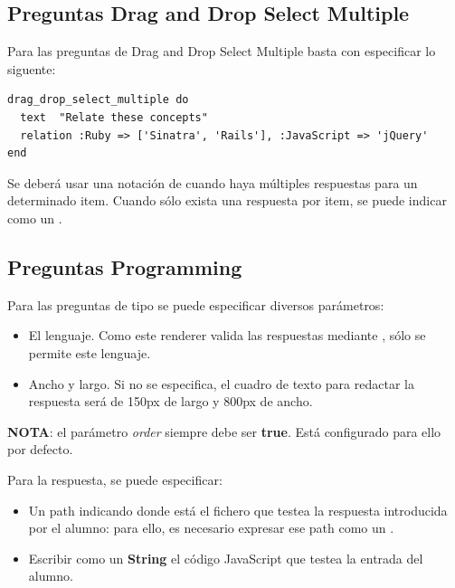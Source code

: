 \subsection{Preguntas Drag and Drop Select Multiple}
\label{subsec:Apendice2.7}

Para las preguntas de Drag and Drop Select Multiple basta con especificar lo siguente:
\begin{lstlisting}
drag_drop_select_multiple do
  text  "Relate these concepts"
  relation :Ruby => ['Sinatra', 'Rails'], :JavaScript => 'jQuery'
end
\end{lstlisting}

Se deber\'a usar una notaci\'on de  cuando haya m\'ultiples respuestas para un determinado item. Cuando s\'olo exista una respuesta por item,
se puede indicar como un .

\subsection{Preguntas Programming}
\label{subsec:Apendice2.8}

Para las preguntas de tipo  se puede especificar diversos par\'ametros:
\begin{itemize}
  \item El lenguaje. Como este renderer valida las respuestas mediante , s\'olo se permite este lenguaje.
  \item Ancho y largo. Si no se especifica, el cuadro de texto para redactar la respuesta ser\'a de 150px de largo y 800px de ancho.
\end{itemize}

{\bfseries NOTA}: el par\'ametro \textit{order} siempre debe ser {\bfseries true}. Est\'a configurado para ello por defecto.
\bigskip
\bigskip

Para la respuesta, se puede especificar: 
\begin{itemize}
  \item Un path indicando donde est\'a el fichero que testea la respuesta introducida por el alumno: para ello, es necesario expresar ese path como un .
  \item Escribir como un {\bfseries String} el c\'odigo JavaScript que testea la entrada del alumno.
\end{itemize}
\bigskip

